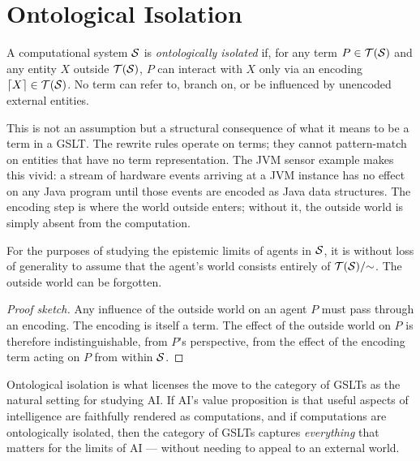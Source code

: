 \chapter{Ontological Isolation}
\label{sec:isolation}

\begin{definition}
A computational system $\mathcal{S}$ is \emph{ontologically isolated} if,
for any term $P \in \mathcal{T}(\mathcal{S})$ and any entity $X$ outside
$\mathcal{T}(\mathcal{S})$, $P$ can interact with $X$ only via an encoding
$\lceil X \rceil \in \mathcal{T}(\mathcal{S})$.
No term can refer to, branch on, or be influenced by unencoded
external entities.
\end{definition}

\begin{remark}
This is not an assumption but a structural consequence of what it
means to be a term in a GSLT.
The rewrite rules operate on terms; they cannot pattern-match on
entities that have no term representation.
The JVM sensor example makes this vivid: a stream of hardware
events arriving at a JVM instance has no effect on any Java program
until those events are encoded as Java data structures.
The encoding step is where the world outside enters; without it,
the outside world is simply absent from the computation.
\end{remark}

\begin{proposition}
For the purposes of studying the epistemic limits of agents in $\mathcal{S}$,
it is without loss of generality to assume that the agent's world
consists entirely of $\mathcal{T}(\mathcal{S})/{\sim}$.
The outside world can be forgotten.
\end{proposition}

\begin{proof}[Proof sketch]
Any influence of the outside world on an agent $P$ must pass through
an encoding.
The encoding is itself a term.
The effect of the outside world on $P$ is therefore indistinguishable,
from $P$'s perspective, from the effect of the encoding term acting
on $P$ from within $\mathcal{S}$.
\end{proof}

\begin{remark}
Ontological isolation is what licenses the move to the category of
GSLTs as the natural setting for studying AI.
If AI's value proposition is that useful aspects of intelligence
are faithfully rendered as computations, and if computations are
ontologically isolated, then the category of GSLTs captures
\emph{everything} that matters for the limits of AI --- without
needing to appeal to an external world.
\end{remark}

